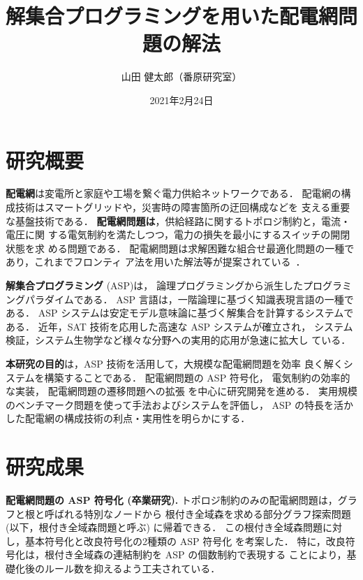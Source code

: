 \documentclass[a4j,10pt,dvipdfmx]{jarticle}
\title{解集合プログラミングを用いた配電網問題の解法}
\author{山田 健太郎（番原研究室）}
\date{2021年2月24日}
\begin{document}
\maketitle
\thispagestyle{empty}
\begin{multicols}{1}

\section{研究概要}
\textbf{配電網}は変電所と家庭や工場を繋ぐ電力供給ネットワークである．
配電網の構成技術はスマートグリッドや，災害時の障害箇所の迂回構成などを
支える重要な基盤技術である．
\textbf{配電網問題は}，供給経路に関するトポロジ制約と，電流・電圧に関
する電気制約を満たしつつ，電力の損失を最小にするスイッチの開閉状態を求
める問題である．
配電網問題は求解困難な組合せ最適化問題の一種であり，これまでフロンティ
ア法を用いた解法等が提案されている~\cite{Minato:dnet:ZDD}．

\textbf{解集合プログラミング}
(ASP)は，
論理プログラミングから派生したプログラミングパラダイムである．
ASP 言語は，一階論理に基づく知識表現言語の一種である．
ASP システムは安定モデル意味論に基づく解集合を計算するシステムである．
近年，SAT 技術を応用した高速な ASP システムが確立され，
システム検証，システム生物学など様々な分野への実用的応用が急速に拡大し
ている．

\textbf{本研究の目的}は，ASP 技術を活用して，大規模な配電網問題を効率
良く解くシステムを構築することである．
配電網問題の ASP 符号化，
電気制約の効率的な実装，
配電網問題の遷移問題への拡張
を中心に研究開発を進める．
実用規模のベンチマーク問題を使って手法およびシステムを評価し，
ASP の特長を活かした配電網の構成技術の利点・実用性を明らかにする．

\section{研究成果}
\textbf{配電網問題の ASP 符号化 (卒業研究).}
%
トポロジ制約のみの配電網問題は，グラフと根と呼ばれる特別なノードから
根付き全域森を求める部分グラフ探索問題(以下，根付き全域森問題と呼ぶ)
に帰着できる．
この根付き全域森問題に対し，基本符号化と改良符号化の2種類の ASP 符号化
を考案した．
特に，改良符号化は，根付き全域森の連結制約を ASP の個数制約で表現する
ことにより，基礎化後のルール数を抑えるよう工夫されている．


\end{multicols}
\end{document}
